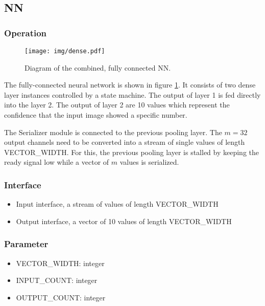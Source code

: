 \subsection{NN}

\subsubsection{Operation}
\begin{figure}[h]
	\centering
	\texttt{[image: img/dense.pdf]}
	\caption{Diagram of the combined, fully connected NN.}
	\label{FIG:nn}
\end{figure}

The fully-connected neural network is shown in figure \ref{FIG:nn}. It consists of two dense layer instances controlled by a state machine. The output of layer 1 is fed directly into the layer 2. The output of layer 2 are 10 values which represent the confidence that the input image showed a specific number. 

The Serializer module is connected to the previous pooling layer. The $m=32$ output channels need to be converted into a stream of single values of length VECTOR\_WIDTH. For this, the previous pooling layer is stalled by keeping the ready signal low while a vector of $m$ values is serialized.

\subsubsection{Interface}
\begin{itemize}
	\item Input interface, a stream of values of length VECTOR\_WIDTH
	\item Output interface, a vector of 10 values of length VECTOR\_WIDTH
\end{itemize}
\subsubsection{Parameter}
\begin{itemize}
	\item VECTOR\_WIDTH: integer
	\item INPUT\_COUNT: integer
	\item OUTPUT\_COUNT: integer
\end{itemize}